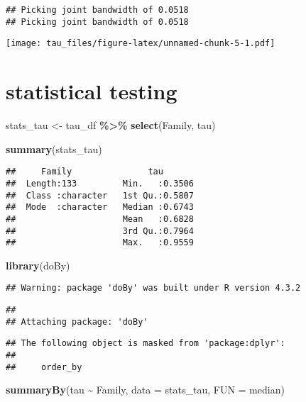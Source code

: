 \documentclass[
]{article}
\newenvironment{Shaded}{\begin{snugshade}}{\end{snugshade}}
\newcommand{\AttributeTok}[1]{\textcolor[rgb]{0.13,0.29,0.53}{#1}}
\newcommand{\FunctionTok}[1]{\textcolor[rgb]{0.13,0.29,0.53}{\textbf{#1}}}
\newcommand{\NormalTok}[1]{#1}
\newcommand{\OtherTok}[1]{\textcolor[rgb]{0.56,0.35,0.01}{#1}}
\newcommand{\SpecialCharTok}[1]{\textcolor[rgb]{0.81,0.36,0.00}{\textbf{#1}}}
\begin{document}
\begin{verbatim}
## Picking joint bandwidth of 0.0518
## Picking joint bandwidth of 0.0518
\end{verbatim}

\texttt{[image: tau\_files/figure-latex/unnamed-chunk-5-1.pdf]}

\hypertarget{statistical-testing}{%
\section{statistical testing}\label{statistical-testing}}

\begin{Shaded}
\begin{Highlighting}[]
\NormalTok{stats\_tau }\OtherTok{\textless{}{-}}\NormalTok{ tau\_df }\SpecialCharTok{\%\textgreater{}\%} \FunctionTok{select}\NormalTok{(Family, tau)}

\FunctionTok{summary}\NormalTok{(stats\_tau)}
\end{Highlighting}
\end{Shaded}

\begin{verbatim}
##     Family               tau        
##  Length:133         Min.   :0.3506  
##  Class :character   1st Qu.:0.5807  
##  Mode  :character   Median :0.6743  
##                     Mean   :0.6828  
##                     3rd Qu.:0.7964  
##                     Max.   :0.9559
\end{verbatim}

\begin{Shaded}
\begin{Highlighting}[]
\FunctionTok{library}\NormalTok{(doBy)}
\end{Highlighting}
\end{Shaded}

\begin{verbatim}
## Warning: package 'doBy' was built under R version 4.3.2
\end{verbatim}

\begin{verbatim}
## 
## Attaching package: 'doBy'
\end{verbatim}

\begin{verbatim}
## The following object is masked from 'package:dplyr':
## 
##     order_by
\end{verbatim}

\begin{Shaded}
\begin{Highlighting}[]
\FunctionTok{summaryBy}\NormalTok{(tau }\SpecialCharTok{\textasciitilde{}}\NormalTok{ Family,}
          \AttributeTok{data =}\NormalTok{ stats\_tau,}
          \AttributeTok{FUN =}\NormalTok{ median)}
\end{Highlighting}
\end{Shaded}
\end{document}
